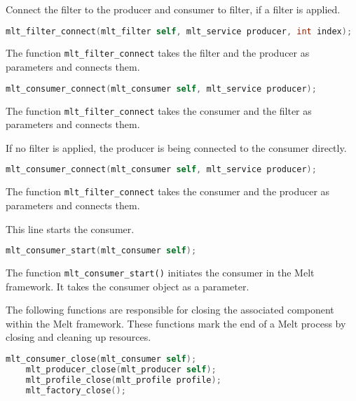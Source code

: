 \documentclass[../MasterThesis.tex]{subfiles}
\begin{document}
\begin{description}[font=\color{RedViolet!80!black}, style=nextline]
	Connect the filter to the producer and consumer to filter, if a filter is applied.
	
	\begin{lstlisting}[language=C, numbers=none, columns=fullflexible, belowskip=0pt, aboveskip=9pt]
	mlt_filter_connect(mlt_filter self, mlt_service producer, int index); \end{lstlisting}

	The function \texttt{mlt\_filter\_connect} takes the filter and the producer as parameters and connects them.
	
	\begin{lstlisting}[language=C, numbers=none, columns=fullflexible, belowskip=0pt, aboveskip=9pt]
	mlt_consumer_connect(mlt_consumer self, mlt_service producer); \end{lstlisting}

	The function \texttt{mlt\_filter\_connect} takes the consumer and the filter as parameters and connects them.
	
	
	If no filter is applied, the producer is being connected to the consumer directly.
	
	\begin{lstlisting}[language=C, numbers=none, columns=fullflexible, belowskip=0pt, aboveskip=9pt]
	mlt_consumer_connect(mlt_consumer self,	mlt_service producer); \end{lstlisting}
	
	The function \texttt{mlt\_filter\_connect} takes the consumer and the producer as parameters and connects them.
	
	
	\item[Start consumer] 
	
	This line starts the consumer.
	
	\begin{lstlisting}[language=C, numbers=none, columns=fullflexible, belowskip=0pt, aboveskip=9pt]
	mlt_consumer_start(mlt_consumer self);	\end{lstlisting}

	The function \texttt{mlt\_consumer\_start()} initiates the consumer in the Melt framework. It takes the consumer object as a parameter. 
	
	
	
	
	
	\item[Close the components]
	
	The following functions are responsible for closing the associated component within the Melt framework. These functions mark the end of a Melt process by closing and cleaning up resources.
	
	\begin{lstlisting}[language=C, numbers=none, columns=fullflexible, belowskip=0pt, aboveskip=9pt]
	mlt_consumer_close(mlt_consumer self); 
	mlt_producer_close(mlt_producer self); 
	mlt_profile_close(mlt_profile profile); 
	mlt_factory_close();\end{lstlisting}
	
	
\end{description}
\end{document}
